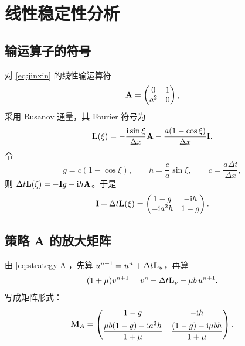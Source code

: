 \section{线性稳定性分析}
\label{sec:jinxin-stability}

\subsection{输运算子的符号}

对 \eqref{eq:jinxin} 的线性输运算符
\begin{equation}
  {\mathbf{A}}=\begin{pmatrix}0&1\\ a^2&0\end{pmatrix},
  \label{eq:transport-matrix}
\end{equation}
采用 Rusanov 通量，其 Fourier 符号为
\begin{equation}
  {\mathbf{L}}(\xi)=-\frac{\mathrm{i}\sin\xi}{\Delta x}{\mathbf{A}}
  -\frac{a(1-\cos\xi)}{\Delta x}{\mathbf{I}}.
  \label{eq:transport-symbol}
\end{equation}
令
\begin{equation}
  g=c(1-\cos\xi),\qquad h=\frac{c}{a}\sin\xi,\qquad c=\frac{a\Delta t}{\Delta x},
  \label{eq:g-h}
\end{equation}
则 $\Delta t{\mathbf{L}}(\xi)=-{\mathbf{I}} g-\mathrm{i} h{\mathbf{A}}$。于是
\begin{equation}
  {\mathbf{I}}+\Delta t{\mathbf{L}}(\xi)=
  \begin{pmatrix}1-g&-\mathrm{i} h\\ -\mathrm{i} a^2h&1-g\end{pmatrix}.
  \label{eq:I-plus-L}
\end{equation}

\subsection{策略 A 的放大矩阵}

由 \eqref{eq:strategy-A}，先算 $u^{n+1}=u^n+\Delta t{\mathbf{L}}_u$，再算
\begin{equation}
  (1+\mu)v^{n+1}=v^n+\Delta t{\mathbf{L}}_v+\mu b\,u^{n+1}.
\end{equation}
写成矩阵形式：
\begin{equation}
  {\mathbf{M}}_A=
  \begin{pmatrix}
    1-g & -\mathrm{i} h\\[4pt]
    \dfrac{\mu b(1-g)-\mathrm{i} a^2h}{1+\mu}
    & \dfrac{(1-g)-\mathrm{i}\mu b h}{1+\mu}
  \end{pmatrix}.
  \label{eq:M-A}
\end{equation}

